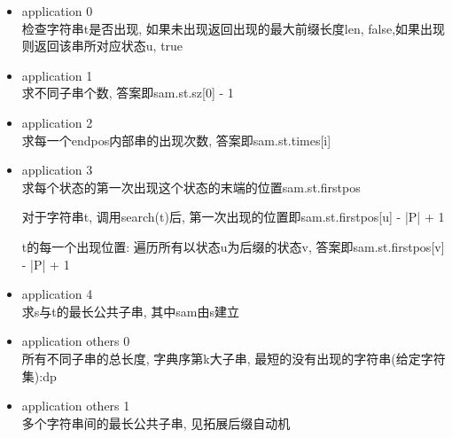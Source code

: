 \begin{itemize}

    \item application 0\\
          检查字符串t是否出现, 如果未出现返回{出现的最大前缀长度len, false},如果出现则返回{该串所对应状态u, true}

    \item application 1\\
          求不同子串个数, 答案即sam.st.sz[0] - 1

    \item application 2\\
          求每一个endpos内部串的出现次数, 答案即sam.st.times[i]

    \item application 3\\
          求每个状态的第一次出现这个状态的末端的位置sam.st.firstpos

          对于字符串t, 调用search(t)后, 第一次出现的位置即sam.st.firstpos[u] - |P| + 1

          t的每一个出现位置: 遍历所有以状态u为后缀的状态v, 答案即{sam.st.firstpos[v] - |P| + 1}

    \item application 4\\
          求s与t的最长公共子串, 其中sam由s建立

    \item application others 0\\
          所有不同子串的总长度, 字典序第k大子串, 最短的没有出现的字符串(给定字符集):dp

    \item application others 1\\
          多个字符串间的最长公共子串, 见拓展后缀自动机

\end{itemize}